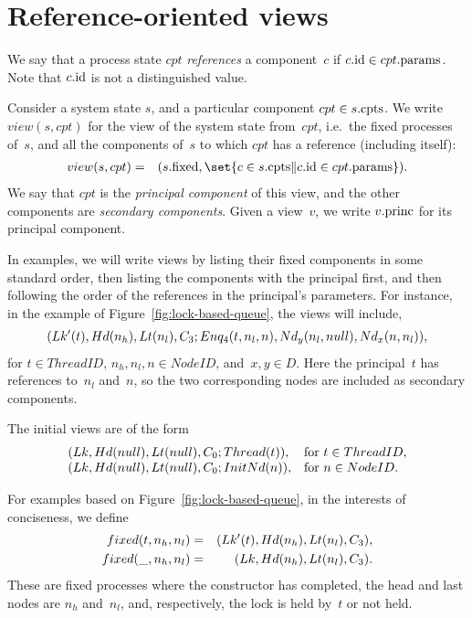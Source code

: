 \section{Reference-oriented views}

We say that a process state $cpt$ \emph{references} a component~$c$ if $c.\mathrm{id}
\in cpt.\mathrm{params}$.  Note that $c.\mathrm{id}$ is not a distinguished value.

Consider a system state $s$, and a particular component $cpt \in s.\mathrm{cpts}$.  We
write $view(s, cpt)$ for the view of the system state from~$cpt$, i.e.~the
fixed processes of~$s$, and all the components of~$s$ to which $cpt$ has a
reference (including itself):
%
%
\begin{eqnarray*}
view(s, cpt) & = &
  (s.\fixed, \set{c \in s.\cpts \| c.\id \in cpt.\params}).
\end{eqnarray*}
%
We say that $cpt$ is the \emph{principal component} of this view, and the
other components are \emph{secondary components}.  Given a view~$v$, we write
$v.\mathrm{princ}$ for its principal component. 

In examples, we will write views by listing their fixed components in some
standard order, then listing the components with the principal first, and then
following the order of the references in the principal's parameters.  For
instance, in the example of Figure~\ref{fig:lock-based-queue}, the views will
include,
\[
\begin{align}
(Lk'(t), Hd(n_h), Lt(n_l), C_3; 
  Enq_4(t, n_l, n), Nd_y(n_l, null),Nd_x(n, n_l)),
\end{align}
\]
for $t \in ThreadID$, $n_h, n_l, n \in NodeID$, and~$x, y \in D$.  Here the
principal~$t$ has references to~$n_l$ and~$n$, so the two corresponding nodes
are included as secondary components.

The initial views are of the form
\[
\begin{array}{ll}
(Lk, Hd(null), Lt(null), C_0; Thread(t)), &
   \mbox{for $t \in ThreadID$}, \\
(Lk, Hd(null), Lt(null), C_0; InitNd(n)), & 
   \mbox{for $n \in NodeID$}.
\end{array}
\]

For examples based on Figure~\ref{fig:lock-based-queue}, in the interests of
conciseness, we define
\begin{eqnarray*}
fixed(t, n_h, n_l) & = & (Lk'(t), Hd(n_h), Lt(n_l), C_3), \\
fixed(\_, n_h, n_l) & = & (Lk, Hd(n_h), Lt(n_l), C_3).
\end{eqnarray*}
%
These are fixed processes where the constructor has completed, the head and
last nodes are $n_h$ and~$n_l$, and, respectively, the lock is held by~$t$ or
not held. 

